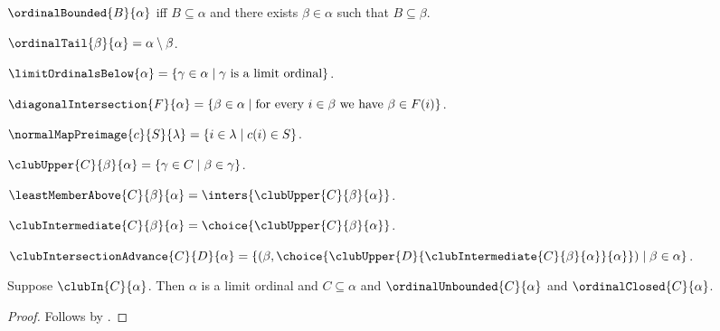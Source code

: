\begin{definition}\label{ordinal_bounded}
    $\ordinalBounded{B}{\alpha}$ iff $B\subseteq\alpha$ and
        there exists $\beta\in\alpha$ such that $B\subseteq\beta$.
\end{definition}

\begin{definition}\label{ordinal_tail}
    $\ordinalTail{\beta}{\alpha}=\alpha\setminus\beta$.
\end{definition}

\begin{definition}\label{limit_ordinals_below}
    $\limitOrdinalsBelow{\alpha}
        =\{\gamma\in\alpha\mid \text{$\gamma$ is a limit ordinal}\}$.
\end{definition}

\begin{definition}\label{diagonal_intersection}
    $\diagonalIntersection{F}{\alpha}
        =\{\beta\in\alpha\mid
            \text{for every $i\in\beta$ we have $\beta\in F(i)$}\}$.
\end{definition}

\begin{definition}\label{normal_map_preimage}
    $\normalMapPreimage{c}{S}{\lambda}
        =\{i\in\lambda\mid c(i)\in S\}$.
\end{definition}

\begin{definition}\label{club_upper}
    $\clubUpper{C}{\beta}{\alpha}
        =\{\gamma\in C\mid \beta\in\gamma\}$.
\end{definition}

\begin{definition}\label{least_member_above}
    $\leastMemberAbove{C}{\beta}{\alpha}
        =\inters{\clubUpper{C}{\beta}{\alpha}}$.
\end{definition}

\begin{definition}\label{club_intermediate}
    $\clubIntermediate{C}{\beta}{\alpha}
        =\choice{\clubUpper{C}{\beta}{\alpha}}$.
\end{definition}

\begin{definition}\label{club_intersection_advance}
    $\clubIntersectionAdvance{C}{D}{\alpha}
        =\{(\beta,
            \choice{\clubUpper{D}{\clubIntermediate{C}{\beta}{\alpha}}{\alpha}})
            \mid \beta\in\alpha\}$.
\end{definition}

\begin{proposition}\label{club_in_elim}
    Suppose $\clubIn{C}{\alpha}$.
    Then $\alpha$ is a limit ordinal and $C\subseteq\alpha$ and
        $\ordinalUnbounded{C}{\alpha}$ and $\ordinalClosed{C}{\alpha}$.
\end{proposition}
\begin{proof}
    Follows by .
\end{proof}


